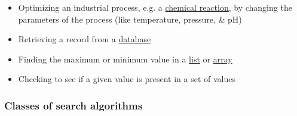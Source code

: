 \documentclass[oneside]{book}
\begin{document}
\begin{itemize}
	\item Optimizing an industrial process, e.g. a \href{https://en.wikipedia.org/wiki/Chemical_reaction}{chemical reaction}, by changing the parameters of the process (like temperature, pressure, \& pH)
	\item Retrieving a record from a \href{https://en.wikipedia.org/wiki/Database}{database}
	\item Finding the maximum or minimum value in a \href{https://en.wikipedia.org/wiki/List_(abstract_data_type)}{list} or \href{https://en.wikipedia.org/wiki/Array_data_structure}{array}
	\item Checking to see if a given value is present in a set of values
\end{itemize}


\subsubsection{Classes of search algorithms}
\end{document}
